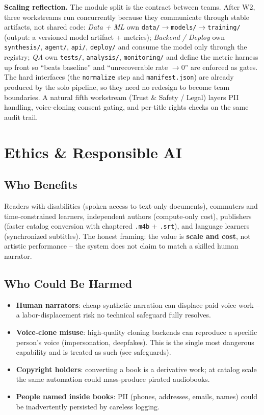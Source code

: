 \documentclass[12pt,a4paper]{article}
\begin{document}
\textbf{Scaling reflection.} The module split is the contract between teams. After W2, three workstreams run concurrently because they communicate through stable artifacts, not shared code: \emph{Data + ML} own \texttt{data/$\rightarrow$models/$\rightarrow$training/} (output: a versioned model artifact + metrics); \emph{Backend / Deploy} own \texttt{synthesis/}, \texttt{agent/}, \texttt{api/}, \texttt{deploy/} and consume the model only through the registry; \emph{QA} own \texttt{tests/}, \texttt{analysis/}, \texttt{monitoring/} and define the metric harness up front so ``beats baseline'' and ``unrecoverable rate $\rightarrow$0'' are enforced as gates. The hard interfaces (the \texttt{normalize} step and \texttt{manifest.json}) are already produced by the solo pipeline, so they need no redesign to become team boundaries. A natural fifth workstream (Trust \& Safety / Legal) layers PII handling, voice-cloning consent gating, and per-title rights checks on the same audit trail.

\section{Ethics \& Responsible AI}

\subsection{Who Benefits}

Readers with disabilities (spoken access to text-only documents), commuters and time-constrained learners, independent authors (compute-only cost), publishers (faster catalog conversion with chaptered \texttt{.m4b} + \texttt{.srt}), and language learners (synchronized subtitles). The honest framing: the value is \textbf{scale and cost}, not artistic performance -- the system does not claim to match a skilled human narrator.

\subsection{Who Could Be Harmed}

\begin{itemize}\setlength\itemsep{0.15em}
  \item \textbf{Human narrators}: cheap synthetic narration can displace paid voice work -- a labor-displacement risk no technical safeguard fully resolves.
  \item \textbf{Voice-clone misuse}: high-quality cloning backends can reproduce a specific person's voice (impersonation, deepfakes). This is the single most dangerous capability and is treated as such (see safeguards).
  \item \textbf{Copyright holders}: converting a book is a derivative work; at catalog scale the same automation could mass-produce pirated audiobooks.
  \item \textbf{People named inside books}: PII (phones, addresses, emails, names) could be inadvertently persisted by careless logging.
\end{itemize}
\end{document}
